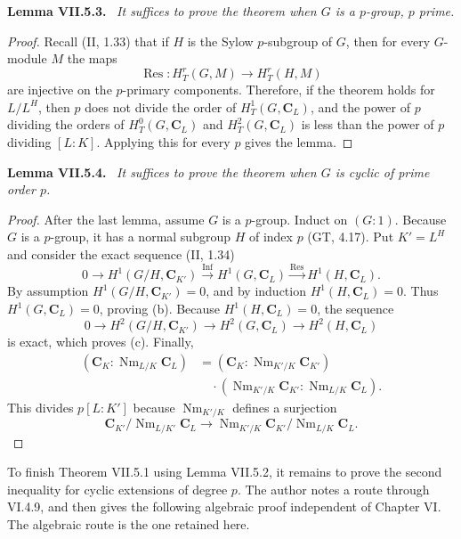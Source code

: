 \documentclass[11pt]{article}
\newcommand{\C}{\mathbf C}
\newcommand{\Nm}{\operatorname{Nm}}
\newcommand{\Res}{\operatorname{Res}}
\newcommand{\Inf}{\operatorname{Inf}}
\newcommand{\HT}[2]{H_T^{#1}(#2)}
\newenvironment{authorresult}[2]{\par\medskip\noindent\textbf{#1 VII.#2.}\ \itshape}{\par\medskip}
\begin{document}
\begin{authorresult}{Lemma}{5.3}
It suffices to prove the theorem when $G$ is a $p$-group, $p$ prime.
\end{authorresult}
\begin{proof}
Recall (II, 1.33) that if $H$ is the Sylow $p$-subgroup of $G$, then for every
$G$-module $M$ the maps
\[
 \Res:\HT r{G,M}\longrightarrow\HT r{H,M}
\]
are injective on the $p$-primary components. Therefore, if the theorem holds
for $L/L^H$, then $p$ does not divide the order of $H_T^1(G,\C_L)$, and the
power of $p$ dividing the orders of $H_T^0(G,\C_L)$ and $H_T^2(G,\C_L)$ is
less than the power of $p$ dividing $[L:K]$. Applying this for every $p$ gives
the lemma.
\end{proof}

\begin{authorresult}{Lemma}{5.4}
It suffices to prove the theorem when $G$ is cyclic of prime order $p$.
\end{authorresult}
\begin{proof}
After the last lemma, assume $G$ is a $p$-group. Induct on $(G:1)$.
Because $G$ is a $p$-group, it has a normal subgroup $H$ of index $p$
(GT, 4.17). Put $K'=L^H$ and consider the exact sequence (II, 1.34)
\[
 0\longrightarrow H^1(G/H,\C_{K'})
 \xrightarrow{\Inf}H^1(G,\C_L)
 \xrightarrow{\Res}H^1(H,\C_L).
\]
By assumption $H^1(G/H,\C_{K'})=0$, and by induction $H^1(H,\C_L)=0$.
Thus $H^1(G,\C_L)=0$, proving (b). Because $H^1(H,\C_L)=0$, the sequence
\[
 0\longrightarrow H^2(G/H,\C_{K'})
 \longrightarrow H^2(G,\C_L)\longrightarrow H^2(H,\C_L)
\]
is exact, which proves (c). Finally,
\begin{align*}
 (\C_K:\Nm_{L/K}\C_L)
 &= (\C_K:\Nm_{K'/K}\C_{K'})\\
 &\quad\cdot(\Nm_{K'/K}\C_{K'}:\Nm_{L/K}\C_L).
\end{align*}
This divides $p[L:K']$ because $\Nm_{K'/K}$ defines a surjection
\[
 \C_{K'}/\Nm_{L/K'}\C_L
 \longrightarrow\Nm_{K'/K}\C_{K'}/\Nm_{L/K}\C_L.
\]
\end{proof}

To finish Theorem VII.5.1 using Lemma VII.5.2, it remains to prove the second
inequality for cyclic extensions of degree $p$. The author notes a route
through VI.4.9, and then gives the following algebraic proof independent of
Chapter VI. The algebraic route is the one retained here.

\end{document}
